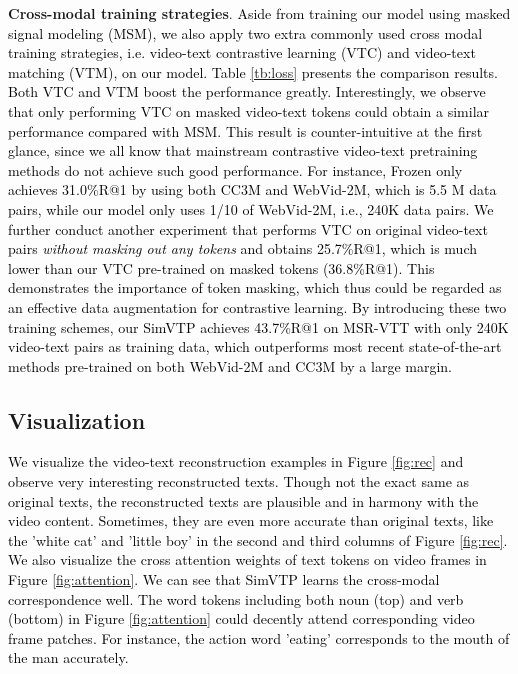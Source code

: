 \documentclass[10pt,twocolumn,letterpaper]{article}
\newcommand{\yty}[1]{\textcolor{black}{#1}}
\newcommand{\ytyn}[1]{\textcolor{black}{#1}}
\begin{document}
\noindent\textbf{Cross-modal training strategies}. 
\yty{Aside from training our model using masked signal modeling (MSM), we also apply two extra commonly used cross modal training strategies, i.e. video-text contrastive learning (VTC) and video-text matching (VTM), on our model. Table \ref{tb:loss} presents the comparison results. Both VTC and VTM boost the performance greatly. Interestingly, we observe that only performing VTC on masked video-text tokens could obtain a similar performance compared with MSM. This result is counter-intuitive at the first glance, since we all know that mainstream contrastive video-text pretraining methods do not achieve such good performance.  For instance, Frozen \cite{bain2021frozen} only achieves 31.0\%R@1 by using both CC3M and WebVid-2M, which is 5.5 M data pairs, while our model only uses 1/10 of WebVid-2M, i.e., 240K data pairs. We further conduct another experiment that performs VTC on original video-text pairs \textit{without masking out any tokens} and obtains 25.7\%R@1, which is much lower than our VTC pre-trained on masked tokens (36.8\%R@1). This demonstrates the importance of token masking, which thus could be regarded as an effective data augmentation for contrastive learning. By introducing these two training schemes, our SimVTP achieves 43.7\%R@1 on MSR-VTT with only 240K video-text pairs as training data, which outperforms most recent state-of-the-art methods pre-trained on both WebVid-2M \cite{bain2021frozen} and CC3M \cite{sharma2018conceptual} by a large margin.}


\subsection{Visualization}
\label{sec:Vis}
\yty{We visualize the video-text reconstruction examples in Figure \ref{fig:rec} and observe very interesting reconstructed texts. Though not the exact same as original texts, the reconstructed texts are plausible and in harmony with the video content. Sometimes, they are even more accurate than original texts, like the 'white cat'  and 'little boy' in the second and third columns of Figure \ref{fig:rec}. We also visualize the cross attention weights of text tokens on video frames in Figure \ref{fig:attention}. We can see that SimVTP learns the cross-modal correspondence well. \ytyn{The word tokens including both noun (top) and verb (bottom) in Figure \ref{fig:attention}} could decently attend corresponding video frame patches. For instance, the action word 'eating' corresponds to the mouth of the man accurately.}
\end{document}
